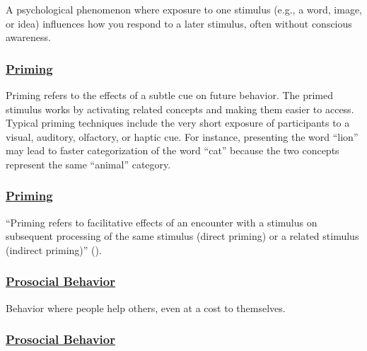 \documentclass[
  letterpaper,
]{book}
\begin{document}
A psychological phenomenon where exposure to one stimulus (e.g., a word,
image, or idea) influences how you respond to a later stimulus, often
without conscious awareness.

\subsubsection*{\texorpdfstring{\hyperref[def-priming]{Priming}}{Priming}}\label{priming}

Priming refers to the effects of a subtle cue on future behavior. The
primed stimulus works by activating related concepts and making them
easier to access. Typical priming techniques include the very short
exposure of participants to a visual, auditory, olfactory, or haptic
cue. For instance, presenting the word ``lion'' may lead to faster
categorization of the word ``cat'' because the two concepts represent
the same ``animal'' category.

\subsubsection*{\texorpdfstring{\hyperref[def-priming]{Priming}}{Priming}}\label{priming-1}

``Priming refers to facilitative effects of an encounter with a stimulus
on subsequent processing of the same stimulus (direct priming) or a
related stimulus (indirect priming)''
().

\subsubsection*{\texorpdfstring{\hyperref[def-prosocialbehavior]{Prosocial
Behavior}}{Prosocial Behavior}}\label{prosocial-behavior}

Behavior where people help others, even at a cost to themselves.

\subsubsection*{\texorpdfstring{\hyperref[def-prosocial]{Prosocial
Behavior}}{Prosocial Behavior}}\label{prosocial-behavior-1}
\end{document}
